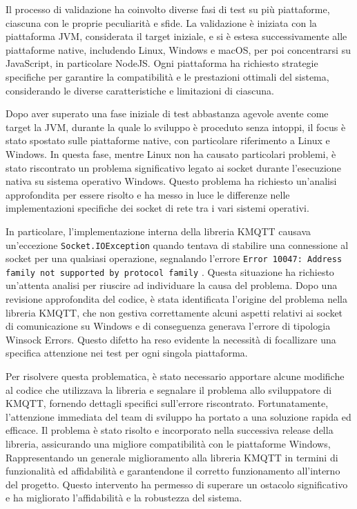 \documentclass[12pt,a4paper,openright,twoside]{book}
\begin{document}
Il processo di validazione ha coinvolto diverse fasi di test su più piattaforme, ciascuna con le proprie peculiarità e sfide. 
La validazione è iniziata con la piattaforma \ac{JVM}, considerata il target iniziale, e si è estesa successivamente alle piattaforme native, 
includendo Linux, Windows e macOS, per poi concentrarsi su JavaScript, in particolare NodeJS. Ogni piattaforma ha richiesto strategie specifiche 
per garantire la compatibilità e le prestazioni ottimali del sistema, considerando le diverse caratteristiche e limitazioni di ciascuna.

Dopo aver superato una fase iniziale di test abbastanza agevole avente come target la \ac{JVM}, durante la quale lo sviluppo è proceduto senza intoppi, 
il focus è stato spostato sulle piattaforme native, con particolare riferimento a Linux e Windows. In questa fase, mentre Linux non ha causato particolari problemi, 
è stato riscontrato un problema significativo legato ai socket durante l'esecuzione nativa su sistema operativo Windows. Questo problema ha richiesto un'analisi 
approfondita per essere risolto e ha messo in luce le differenze nelle implementazioni specifiche dei socket di rete tra i vari sistemi operativi.

In particolare, l'implementazione interna della libreria KMQTT causava un'eccezione \texttt{Socket.IOException} quando tentava di stabilire una connessione 
al socket per una qualsiasi operazione, segnalando l'errore \texttt{Error 10047: Address family not supported by protocol family} \cite{windows-docs}. 
Questa situazione ha richiesto un'attenta analisi per riuscire ad individuare la causa del problema. Dopo una revisione approfondita del codice, è stata identificata 
l'origine del problema nella libreria KMQTT, che non gestiva correttamente alcuni aspetti relativi ai socket di comunicazione su Windows e di conseguenza generava l'errore 
di tipologia Winsock Errors. Questo difetto ha reso evidente la necessità di focallizare una specifica attenzione nei test per ogni singola piattaforma.

Per risolvere questa problematica, è stato necessario apportare alcune modifiche al codice che utilizzava la libreria e segnalare il problema allo sviluppatore 
di KMQTT, fornendo dettagli specifici sull'errore riscontrato. Fortunatamente, l'attenzione immediata del team di sviluppo ha portato a una soluzione rapida ed efficace. 
Il problema è stato risolto e incorporato nella successiva release della libreria, assicurando una migliore compatibilità con le piattaforme Windows,
Rappresentando un generale miglioramento alla libreria KMQTT in termini di funzionalità ed affidabilità e garantendone il corretto funzionamento all'interno del progetto. 
Questo intervento ha permesso di superare un ostacolo significativo e ha migliorato l'affidabilità e la robustezza del sistema.
\end{document}
